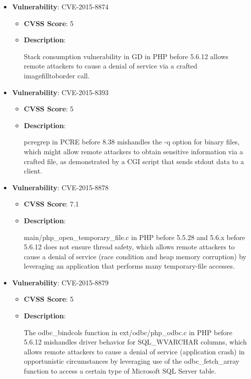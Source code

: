 \documentclass{article}
\begin{document}
\begin{itemize}
        \item \textbf{Vulnerability}: CVE-2015-8874
        \begin{itemize}
            \item \textbf{CVSS Score}:  5 
            \item \textbf{Description}:
            \parbox[t]{0.9\linewidth}{
                \ttfamily Stack consumption vulnerability in GD in PHP before 5.6.12 allows remote attackers to cause a denial of service via a crafted imagefilltoborder call.
            }
        \end{itemize}
    
        \item \textbf{Vulnerability}: CVE-2015-8393
        \begin{itemize}
            \item \textbf{CVSS Score}:  5 
            \item \textbf{Description}:
            \parbox[t]{0.9\linewidth}{
                \ttfamily pcregrep in PCRE before 8.38 mishandles the -q option for binary files, which might allow remote attackers to obtain sensitive information via a crafted file, as demonstrated by a CGI script that sends stdout data to a client.
            }
        \end{itemize}
    
        \item \textbf{Vulnerability}: CVE-2015-8878
        \begin{itemize}
            \item \textbf{CVSS Score}:  7.1 
            \item \textbf{Description}:
            \parbox[t]{0.9\linewidth}{
                \ttfamily main/php\_open\_temporary\_file.c in PHP before 5.5.28 and 5.6.x before 5.6.12 does not ensure thread safety, which allows remote attackers to cause a denial of service (race condition and heap memory corruption) by leveraging an application that performs many temporary-file accesses.
            }
        \end{itemize}
    
        \item \textbf{Vulnerability}: CVE-2015-8879
        \begin{itemize}
            \item \textbf{CVSS Score}:  5 
            \item \textbf{Description}:
            \parbox[t]{0.9\linewidth}{
                \ttfamily The odbc\_bindcols function in ext/odbc/php\_odbc.c in PHP before 5.6.12 mishandles driver behavior for SQL\_WVARCHAR columns, which allows remote attackers to cause a denial of service (application crash) in opportunistic circumstances by leveraging use of the odbc\_fetch\_array function to access a certain type of Microsoft SQL Server table.
            }
        \end{itemize}
    

\end{itemize}
\end{document}
